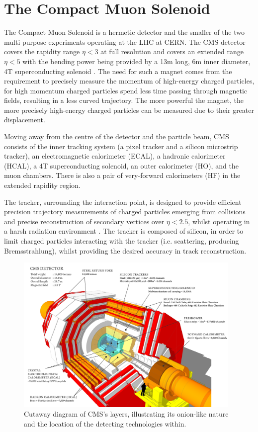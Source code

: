 \section{The Compact Muon Solenoid}\label{sec:cms}

The Compact Muon Solenoid is a hermetic detector and the smaller of the two multi-purpose experiments operating at the LHC at CERN.
The CMS detector covers the rapidity range $\eta < 3$ at full resolution and covers an extended range $\eta < 5$ with the bending power being provided by a 13m long, 6m inner diameter, 4T superconducting solenoid .
The need for such a magnet comes from the requirement to precisely measure the momentum of high-energy charged particles, for high momentum charged particles spend less time passing through magnetic fields, resulting in a less curved trajectory.
The more powerful the magnet, the more precisely high-energy charged particles can be measured due to their greater displacement\cite{oldcms}.

Moving away from the centre of the detector and the particle beam, CMS consists of the inner tracking system (a pixel tracker and a silicon microstrip tracker), an electromagnetic calorimeter (ECAL), a hadronic calorimeter (HCAL), a 4T superconducting solenoid, an outer calorimeter (HO), and the muon chambers.
There is also a pair of very-forward calorimeters (HF) in the extended rapidity region\cite{oldcms}.

The tracker, surrounding the interaction point, is designed to provide efficient precision trajectory measurements of charged particles emerging from collisions and precise reconstruction of secondary vertices over $\eta < 2.5$, whilst operating in a harsh radiation environment .
The tracker is composed of silicon, in order to limit charged particles interacting with the tracker (i.e. scattering, producing Bremsstrahlung), whilst providing the desired accuracy in track reconstruction\cite{oldcms}.

\begin{figure}[htbp]
\begin{center}
\includegraphics[width=0.97\textwidth]{figs/cms/cms_120918_03.png}
\caption{Cutaway diagram of CMS’s layers, illustrating its onion-like nature and the location of the detecting technologies within.}
\label{fig:cern-accelerator-complex}
\end{center}
\end{figure}

